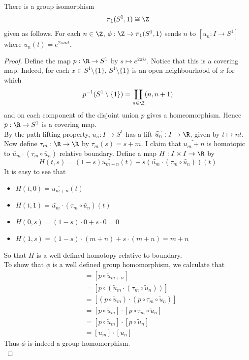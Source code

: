 \documentclass[a4paper]{article}
\begin{document}
\begin{thm}{}{} There is a group isomorphism $$\pi_1(S^1,1)\cong\Z$$ given as follows. For each $n\in\Z$, $\phi:\Z\to\pi_1(S^1,1)$ sends $n$ to $[u_n:I\to S^1]$ where $u_n(t)=e^{2\pi int}$. 
\begin{proof}
Define the map $p:\R\to S^1$ by $s\mapsto e^{2\pi is}$. Notice that this is a covering map. Indeed, for each $x\in S^1\setminus\{1\}$, $S^1\setminus\{1\}$ is an open neighbourhood of $x$ for which $$p^{-1}(S^1\setminus\{1\})=\coprod_{n\in\Z}(n,n+1)$$ and on each component of the disjoint union $p$ gives a homeomorphism. Hence $p:\R\to S^1$ is a covering map. \\

By the path lifting property, $u_n:I\to S^1$ has a lift $\widetilde{u_n}:I\to\R$, given by $t\mapsto nt$. Now define $\tau_m:\R\to\R$ by $\tau_m(s)=s+m$. I claim that $\widetilde{u_m+n}$ is homotopic to $\widetilde{u_m}\cdot(\tau_m\circ\widetilde{u_n})$ relative boundary. Define a map $H:I\times I\to\R$ by $$H(t,s)=(1-s)\widetilde{u_{m+n}}(t)+s(\widetilde{u_m}\cdot(\tau_m\circ\widetilde{u_n}))(t)$$ It is easy to see that 
\begin{itemize}
\item $H(t,0)=\widetilde{u_{m+n}}(t)$
\item $H(t,1)=\widetilde{u_m}\cdot(\tau_m\circ\widetilde{u_n})(t)$
\item $H(0,s)=(1-s)\cdot 0+s\cdot 0=0$
\item $H(1,s)=(1-s)\cdot(m+n)+s\cdot(m+n)=m+n$
\end{itemize}
So that $H$ is a well defined homotopy relative to boundary. \\

To show that $\phi$ is a well defined group homomorphism, we calculate that 
\begin{align*}
[u_{m+n}]&=[p\circ\widetilde{u}_{m+n}]\tag{Lift of $u$}\\
&=[p\circ(\widetilde{u}_m\cdot(\tau_m\circ\widetilde{u}_n))]\tag{Homotopies descend}\\
&=[(p\circ\widetilde{u}_m)\cdot(p\circ\tau_m\circ\widetilde{u}_n)]\tag{Paths descend}\\
&=[p\circ\widetilde{u}_m]\cdot[p\circ\tau_m\circ\widetilde{u}_n]\tag{Concatenation is well defined up to homotopy}\\
&=[p\circ\widetilde{u}_m]\cdot[p\circ\widetilde{u}_n]\tag{$p\circ\tau_m=p$}\\
&=[u_m]\cdot[u_n]\tag{Lift of $u$}
\end{align*}
Thus $\phi$ is indeed a group homomorphism. \\


\end{proof}
\end{thm}
\end{document}
